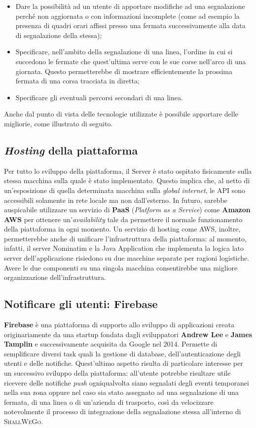 		\begin{itemize}
			\item Dare la possibilità ad un utente di apportare modifiche ad una segnalazione perché non aggiornata o con informazioni incomplete (come ad esempio la presenza di quadri orari affissi presso una fermata successivamente alla data di segnalazione della stessa);
			\item Specificare, nell'ambito della segnalazione di una linea, l'ordine in cui si succedono le fermate che quest'ultima serve con le sue corse nell'arco di una giornata. Questo permetterebbe di mostrare efficientemente la prossima fermata di una corsa tracciata in diretta;
			\item Specificare gli eventuali percorsi secondari di una linea. 
		\end{itemize}

		Anche dal punto di vista delle tecnologie utilizzate è possibile apportare delle migliorie, come illustrato di seguito. 

		\subsection{\textit{Hosting} della piattaforma}
			Per tutto lo sviluppo della piattaforma, il Server è stato ospitato fisicamente sulla stessa macchina sulla quale è stato implementato. Questo implica che, al netto di un'esposizione di quella determinata macchina sulla \textit{global internet}, le API sono accessibili solamente in rete locale ma non dall'esterno. In futuro, sarebbe auspicabile utilizzare un servizio di \textbf{PaaS} (\textit{Platform as a Service}) come \textbf{Amazon AWS} per ottenere un'\textit{availability} tale da permettere il normale funzionamento della piattaforma in ogni momento. Un servizio di hosting come AWS, inoltre, permetterebbe anche di unificare l'infrastruttura della piattaforma: al momento, infatti, il server Nominatim e la Java Application che implementa la logica lato server dell'applicazione risiedono su due macchine separate per ragioni logistiche. Avere le due componenti su una singola macchina consentirebbe una migliore organizzazione dell'infrastruttura.

		\subsection{Notificare gli utenti: Firebase}
			\textbf{Firebase} è una piattaforma di supporto allo sviluppo di applicazioni creata originariamente da una startup fondata dagli sviluppatori \textbf{Andrew Lee} e \textbf{James Tamplin} e successivamente acquisita da Google nel 2014. Permette di semplificare diversi task quali la gestione di database, dell'autenticazione degli utenti e delle notifiche. Quest'ultimo aspetto risulta di particolare interesse per un successivo sviluppo della piattaforma: all'utente potrebbe risultare utile ricevere delle notifiche \textit{push} ogniqualvolta siano segnalati degli eventi temporanei nella sua zona oppure nel caso sia stato assegnato ad una segnalazione di una fermata, di una linea o di un'azienda di trasporto, così da velocizzare notevolmente il processo di integrazione della segnalazione stessa all'interno di \textsc{ShallWeGo}.